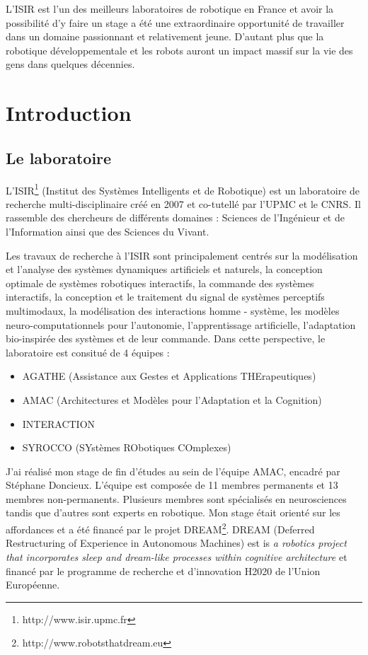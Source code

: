 \documentclass{llncs}
\begin{document}
L'ISIR est l'un des meilleurs laboratoires de robotique en France et avoir la possibilité d'y faire un stage a été une extraordinaire opportunité de travailler dans un domaine passionnant et relativement jeune. D'autant plus que la robotique développementale et les robots auront un impact massif sur la vie des gens dans quelques décennies.


\section{Introduction}


\subsection{Le laboratoire}

L'ISIR\footnote{http://www.isir.upmc.fr} (Institut des Systèmes Intelligents et de Robotique) est un laboratoire de recherche multi-disciplinaire créé en 2007 et co-tutellé par l'UPMC et le CNRS. Il rassemble des chercheurs de différents domaines : Sciences de l’Ingénieur et de l’Information ainsi que des Sciences du Vivant.

Les travaux de recherche à l'ISIR sont principalement centrés sur la modélisation et l'analyse des systèmes dynamiques artificiels et naturels, la conception optimale de systèmes robotiques interactifs, la commande des systèmes interactifs, la conception et le traitement du signal de systèmes perceptifs multimodaux, la modélisation des interactions homme - système, les modèles neuro-computationnels pour l’autonomie, l'apprentissage artificielle, l'adaptation bio-inspirée des systèmes et de leur commande. Dans cette perspective, le laboratoire est consitué de 4 équipes :
\begin{itemize}
\item AGATHE (Assistance aux Gestes et Applications THErapeutiques)
\item AMAC (Architectures et Modèles pour l'Adaptation et la Cognition)
\item INTERACTION
\item SYROCCO (SYstèmes RObotiques COmplexes)
\end{itemize}

J'ai réalisé mon stage de fin d'études au sein de l'équipe AMAC, encadré par Stéphane Doncieux. L'équipe est composée de 11 membres permanents et 13 membres non-permanents. Plusieurs membres sont spécialisés en neurosciences tandis que d'autres sont experts en robotique. Mon stage était orienté sur les affordances et a été financé par le projet DREAM\footnote{http://www.robotsthatdream.eu}. DREAM (Deferred Restructuring of Experience in Autonomous Machines) est is \textit{a robotics project that incorporates sleep and dream-like processes within cognitive architecture} et financé par le programme de recherche et d'innovation H2020 de l'Union Européenne.
\end{document}
